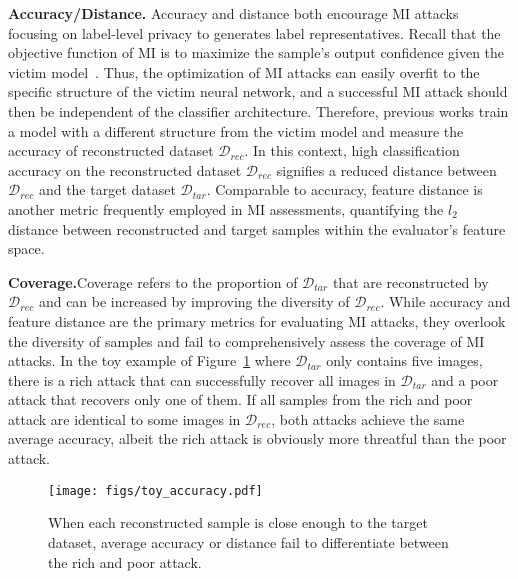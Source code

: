 \noindent
\textbf{Accuracy/Distance.}\quad
Accuracy and distance both encourage MI attacks focusing on label-level privacy to generates label representatives.
Recall that the objective function of MI is to maximize the sample's output confidence given the victim model~\cite{mi15}.
Thus, the optimization of MI attacks can easily overfit to the specific structure of the victim neural network, and a successful MI attack should then be independent of the classifier architecture.
Therefore, previous works train a model with a different structure from the victim model and measure the accuracy of reconstructed dataset $\mathcal{D}_{rec}$.
In this context, high classification accuracy on the reconstructed dataset $\mathcal{D}_{rec}$ signifies a reduced distance between $\mathcal{D}_{rec}$ and the target dataset $\mathcal{D}_{tar}$.
Comparable to accuracy, feature distance is another metric frequently employed in MI assessments, quantifying the $l_2$ distance between reconstructed and target samples within the evaluator's feature space.

\noindent
\textbf{Coverage.}\quad Coverage refers to the proportion of $\mathcal{D}_{tar}$ that are reconstructed by $\mathcal{D}_{rec}$ and can be increased by improving the diversity of $\mathcal{D}_{rec}$. While accuracy and feature distance are the primary metrics for evaluating MI attacks, they overlook the diversity of samples and fail to comprehensively assess the coverage of MI attacks.
In the toy example of Figure~\ref{fig:toy_accuracy} where $\mathcal{D}_{tar}$ only contains five images, there is a rich attack that can successfully recover all images in $\mathcal{D}_{tar}$ and a poor attack that recovers only one of them.
If all samples from the rich and poor attack are identical to some images in $\mathcal{D}_{rec}$, both attacks achieve the same average accuracy, albeit the rich attack is obviously more threatful than the poor attack.

\begin{figure}[htb]%
	\centering
	\texttt{[image: figs/toy\_accuracy.pdf]}
	\caption{When each reconstructed sample is close enough to the target dataset, average accuracy or distance fail to differentiate between the rich and poor attack.}
	\label{fig:toy_accuracy}
\end{figure}

